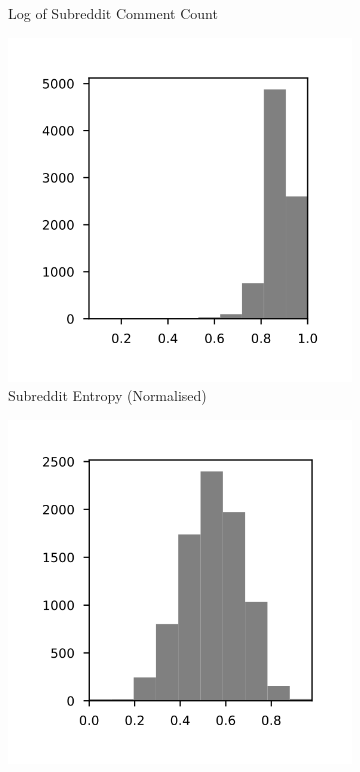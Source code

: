 \documentclass{article}
\begin{document}
\begin{figure}
\begin{subfigure}[b]{0.49\textwidth}
         \caption{Log of Subreddit Comment Count}
         \label{hist:comment}
     \end{subfigure}
     \hfill
     \begin{subfigure}[b]{0.49\textwidth}
         \centering
         \includegraphics[width=\textwidth]{hist-entropy_norm.svg}
         \caption{Subreddit Entropy (Normalised)}
         \label{hist:entropy}
     \end{subfigure}
     \hfill
     \begin{subfigure}[b]{0.49\textwidth}
         \centering
         \includegraphics[width=\textwidth]{hist-gini.svg}

\end{subfigure}
\end{figure}
\end{document}
